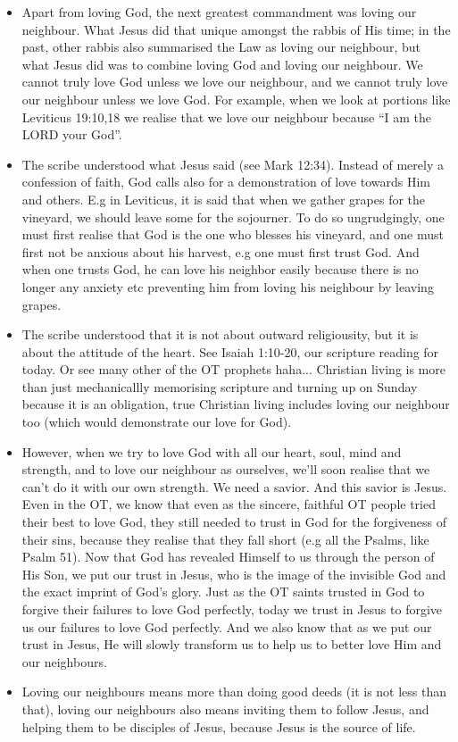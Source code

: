 \begin{itemize}
{  turning away from life and turning unto death.}
  \item{Apart from loving God, the next greatest commandment was loving our
  neighbour.  What Jesus did that unique amongst the rabbis of His time; in
  the past, other rabbis also summarised the Law as loving our neighbour, but
  what Jesus did was to combine loving God and loving our neighbour.  We
  cannot truly love God unless we love our neighbour, and we cannot truly
  love our neighbour unless we love God.  For example, when we look at
  portions like Leviticus 19:10,18 we realise that we love our neighbour
  because ``I am the LORD your God''.}
  \item{The scribe understood what Jesus said (see Mark 12:34).  Instead of
  merely a confession of faith, God calls also for a demonstration of love
  towards Him and others.  E.g in Leviticus, it is said that when we gather
  grapes for the vineyard, we should leave some for the sojourner.  To do so
  ungrudgingly, one must first realise that God is the one who blesses his
  vineyard, and one must first not be anxious about his harvest, e.g one must
  first trust God.  And when one trusts God, he can love his neighbor easily
  because there is no longer any anxiety etc preventing him from loving his
  neighbour by leaving grapes.}
  \item{The scribe understood that it is not about outward religiousity, but
  it is about the attitude of the heart.  See Isaiah 1:10-20, our scripture
  reading for today.  Or see many other of the OT prophets haha...  Christian
  living is more than just mechanicallly memorising scripture and turning up
  on Sunday because it is an obligation, true Christian living includes
  loving our neighbour too (which would demonstrate our love for God).}
  \item{However, when we try to love God with all our heart, soul, mind and
  strength, and to love our neighbour as ourselves, we'll soon realise that
  we can't do it with our own strength.  We need a savior.  And this savior
  is Jesus.  Even in the OT, we know that even as the sincere, faithful OT
  people tried their best to love God, they still needed to trust in God for
  the forgiveness of their sins, because they realise that they fall short
  (e.g all the Psalms, like Psalm 51).  Now that God has revealed Himself to
  us through the person of His Son, we put our trust in Jesus, who is the
  image of the invisible God and the exact imprint of God's glory.  Just as
  the OT saints trusted in God to forgive their failures to love God
  perfectly, today we trust in Jesus to forgive us our failures to love God
  perfectly.  And we also know that as we put our trust in Jesus, He will
  slowly transform us to help us to better love Him and our neighbours.}
  \item{Loving our neighbours means more than doing good deeds (it is not
  less than that), loving our neighbours also means inviting them to follow
  Jesus, and helping them to be disciples of Jesus, because Jesus is the
  source of life.}
\end{itemize}